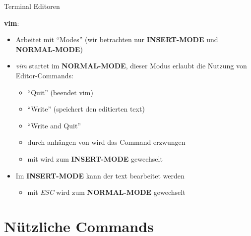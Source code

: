 \documentclass{setbeamer}
\begin{document}
\begin{frame}{Terminal Editoren}

    \textbf{vim}:
    \begin{itemize}
        \item Arbeitet mit ``Modes'' (wir betrachten nur \textbf{INSERT-MODE} und \textbf{NORMAL-MODE})
        \item \emph{vim} startet im \textbf{NORMAL-MODE}, dieser Modus erlaubt die Nutzung von Editor-Commands:
            \begin{itemize}
                \item {}\textemdash ``Quit'' (beendet vim)
                \item {}\textemdash ``Write'' (speichert den editierten text)
                \item {}\textemdash ``Write and Quit''
                \item durch anhängen von  wird das Command erzwungen
                \item mit  wird zum \textbf{INSERT-MODE} gewechselt
            \end{itemize}
        \item Im \textbf{INSERT-MODE} kann der text bearbeitet werden
            \begin{itemize}
                \item mit \emph{ESC} wird zum \textbf{NORMAL-MODE} gewechselt
            \end{itemize}
    \end{itemize}
\end{frame}

\section{Nützliche Commands}
\end{document}

